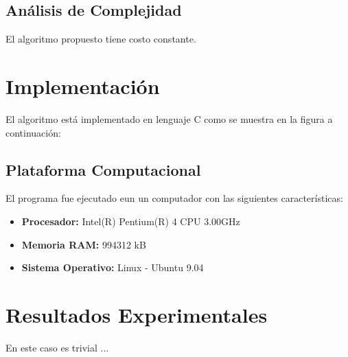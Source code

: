 \documentclass{report}
\begin{document}
\subsection{An\'alisis de Complejidad}
El algoritmo propuesto tiene costo constante.
%
\section{Implementaci\'on}
El algoritmo est\'a implementado en lenguaje C como se muestra en la figura a continuaci\'on:
\newpage
%
\subsection{Plataforma Computacional}
El programa fue ejecutado eun un computador con las siguientes caracter\'isticas:
\begin{itemize}
\item {\bf Procesador:} Intel(R) Pentium(R) 4 CPU 3.00GHz
\item {\bf Memoria RAM:} 994312 kB
\item {\bf Sistema Operativo:} Linux - Ubuntu 9.04 
\end{itemize}
%
\section{Resultados Experimentales}
En este caso es trivial ...
%
\end{document}
